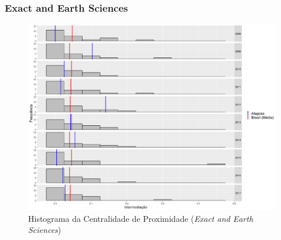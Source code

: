 \subsubsection{Exact and Earth Sciences}

\begin{figure}[H]
	\centering
	\includegraphics[scale=0.6]{Imagens/exact/betweeness-hist.pdf}
	\caption{Histograma da Centralidade de Proximidade (\textit{Exact and Earth Sciences})}
\end{figure}


